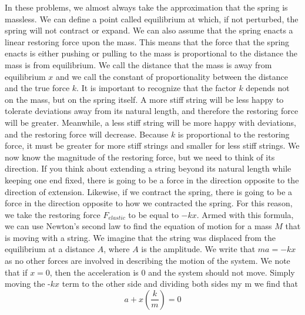 In these problems, we almost always take the approximation that the spring is massless. We can define a point called equilibrium at which, if not perturbed, the spring will not contract or expand. We can also assume that the spring enacts a linear restoring force upon the mass. This means that the force that the spring enacts is either pushing or pulling to the mass is proportional to the distance the mass is from equilibrium. We call the distance that the mass is away from equilibrium $x$ and we call the constant of proportionality between the distance and the true force $k$. It is important to recognize that the factor $k$ depends not on the mass, but on the spring itself. A more stiff string will be less happy to tolerate deviations away from its natural length, and therefore the restoring force will be greater. Meanwhile, a less stiff string will be more happy with deviations, and the restoring force will decrease. Because $k$ is proportional to the restoring force, it must be greater for more stiff strings and smaller for less stiff strings. 
We now know the magnitude of the restoring force, but we need to think of its direction. If you think about extending a string beyond its natural length while keeping one end fixed, there is going to be a force in the direction opposite to the direction of extension. Likewise, if we contract the spring, there is going to be a force in the direction opposite to how we contracted the spring. For this reason, we take the restoring force $F_{elastic}$ to be equal to $-kx$. Armed with this formula, we can use Newton’s second law to find the equation of motion for a mass $M$ that is moving with a string. We imagine that the string was displaced from the equilibrium at a distance $A$, where $A$ is the amplitude. We write that $ma=-kx$ as no other forces are involved in describing the motion of the system. We note that if $x=0$, then the acceleration is 0 and the system should not move. Simply moving the -$kx$ term to the other side and dividing both sides my m we find that \begin{equation}a+x\left(\frac{k}{m}\right)=0\end{equation}
